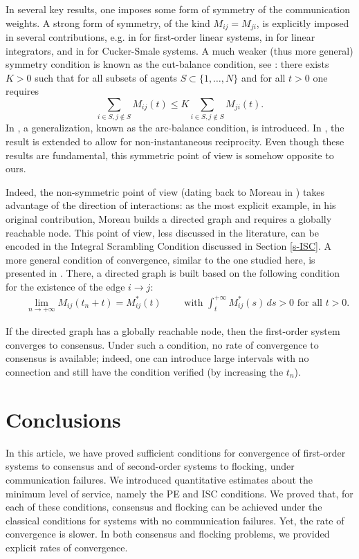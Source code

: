 \documentclass[journal]{article}
\begin{document}
In several key results, one imposes some form of symmetry of the communication weights. A strong form of symmetry, of the kind $M_{ij}=M_{ji}$, is explicitly imposed in several contributions, e.g. in \cite{chowdhury2018estimation} for first-order linear systems, in \cite{chowdhury2015consensus} for linear integrators, and in  \cite{bonnet2021consensus} for Cucker-Smale systems. A much weaker (thus more general) symmetry condition is known as the cut-balance condition, see \cite{cut-balance}: there exists $K>0$ such that for all subsets of agents $S\subset \{1,\ldots, N \}$ and for all $t > 0$ one requires
$$ \sum_{i\in S,j\not\in S} M_{ij}(t) \leq K \sum_{i\in S,j\not\in S} M_{ji}(t).$$ In \cite{arc-balance}, a generalization, known as the arc-balance condition, is introduced. In \cite{cut-balance2}, the result is extended to allow for non-instantaneous reciprocity.
Even though these results are fundamental, this symmetric point of view is somehow opposite to ours.

Indeed, the non-symmetric point of view (dating back to Moreau in \cite{moreau2004stability}) takes advantage of the direction of interactions: as the most explicit example, in his original contribution, Moreau builds a directed graph and requires a globally reachable node. This point of view, less discussed in the literature, can be encoded in the Integral Scrambling Condition discussed in Section \ref{s-ISC}. A more general condition of convergence, similar to the one studied here, is presented in \cite{caravenna}. There, a directed graph is built based on the following condition for the existence of the edge $i\to j$:
\begin{eqnarray*}&&\lim_{n\to +\infty} M_{ij}(t_n+t)= M_{ij}^*(t)\qquad \mbox{~with~} \int_t^{+\infty} M_{ij}^*(s)\,ds>0 \mbox{~for all $t>0$.}
\end{eqnarray*}

If the directed graph has a globally reachable node, then the first-order system converges to consensus. Under such a condition, no rate of convergence to consensus is available; indeed, one can introduce large intervals with no connection and still have the condition verified (by increasing the $t_n$).

\section{Conclusions}
\label{s-conclusions}

In this article, we have proved sufficient conditions for convergence of first-order systems to consensus and of second-order systems to flocking, under communication failures. We introduced quantitative estimates about the minimum level of service, namely the PE and ISC conditions. We proved that, for each of these conditions, consensus and flocking can be achieved under the classical conditions for systems with no communication failures. Yet, the rate of convergence is slower. In both consensus and flocking problems, we provided explicit rates of convergence.
\end{document}
